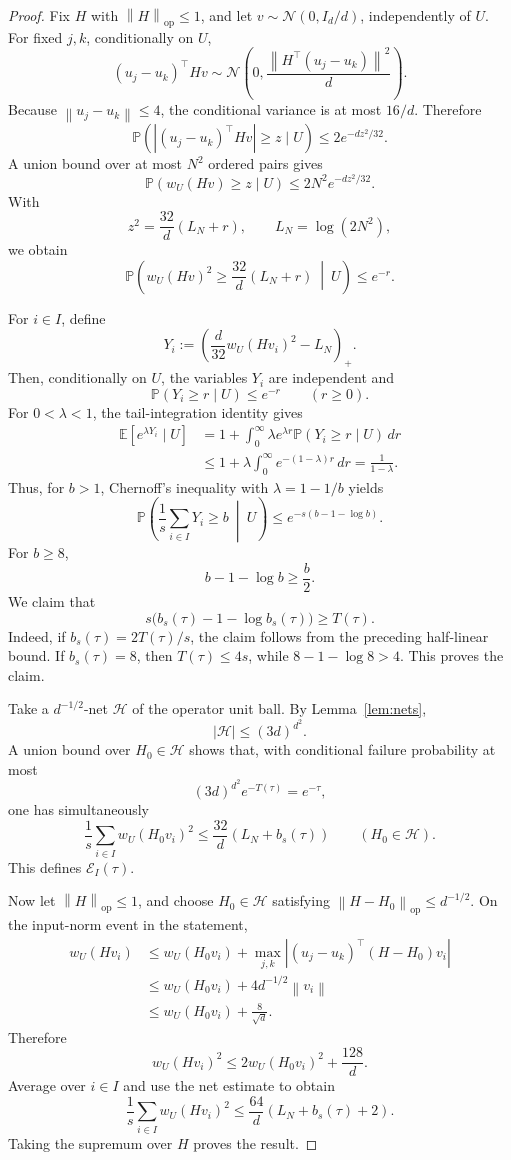 \documentclass[11pt]{article}
\newcommand{\E}{\mathbb{E}}
\newcommand{\Pp}{\mathbb{P}}
\newcommand{\1}{\mathbf{1}}
\newcommand{\op}{\mathrm{op}}
\newcommand{\norm}[1]{\left\|#1\right\|}
\newcommand{\abs}[1]{\left|#1\right|}
\begin{document}
\begin{proof}
Fix \(H\) with \(\norm{H}_{\op}\le1\), and let
\(v\sim\mathcal N(0,I_d/d)\), independently of \(U\).  For fixed \(j,k\),
conditionally on \(U\),
\[
 (u_j-u_k)^\top Hv
 \sim
 \mathcal N\left(
 0,\frac{\norm{H^\top(u_j-u_k)}^2}{d}
 \right).
\]
Because \(\norm{u_j-u_k}\le4\), the conditional variance is at most
\(16/d\).  Therefore
\[
 \Pp\left(
 \abs{(u_j-u_k)^\top Hv}\ge z\mid U
 \right)
 \le2e^{-dz^2/32}.
\]
A union bound over at most \(N^2\) ordered pairs gives
\[
 \Pp\left(w_U(Hv)\ge z\mid U\right)
 \le2N^2e^{-dz^2/32}.
\]
With
\[
 z^2=\frac{32}{d}(L_N+r),
 \qquad
 L_N=\log(2N^2),
\]
we obtain
\[
 \Pp\left(
 w_U(Hv)^2\ge\frac{32}{d}(L_N+r)
 \ \middle|\ U
 \right)
 \le e^{-r}.
\]

For \(i\in I\), define
\[
 Y_i
 :=
 \left(
 \frac d{32}w_U(Hv_i)^2-L_N
 \right)_+.
\]
Then, conditionally on \(U\), the variables \(Y_i\) are independent and
\[
 \Pp(Y_i\ge r\mid U)\le e^{-r}
 \qquad (r\ge0).
\]
For \(0<\lambda<1\), the tail-integration identity gives
\begin{align*}
 \E[e^{\lambda Y_i}\mid U]
 &=
 1+\int_0^\infty \lambda e^{\lambda r}
 \Pp(Y_i\ge r\mid U)\,dr\\
 &\le
 1+\lambda\int_0^\infty e^{-(1-\lambda)r}\,dr
 =\frac1{1-\lambda}.
\end{align*}
Thus, for \(b>1\), Chernoff's inequality with \(\lambda=1-1/b\) yields
\[
 \Pp\left(
 \frac1s\sum_{i\in I}Y_i\ge b
 \ \middle|\ U
 \right)
 \le
 e^{-s(b-1-\log b)}.
\]
For \(b\ge8\),
\[
 b-1-\log b\ge\frac b2.
\]
We claim that
\[
 s\bigl(b_s(\tau)-1-\log b_s(\tau)\bigr)\ge T(\tau).
\]
Indeed, if \(b_s(\tau)=2T(\tau)/s\), the claim follows from the preceding
half-linear bound.  If \(b_s(\tau)=8\), then \(T(\tau)\le4s\), while
\(8-1-\log8>4\).  This proves the claim.

Take a \(d^{-1/2}\)-net \(\mathcal H\) of the operator unit ball.  By
Lemma~\ref{lem:nets},
\[
 \abs{\mathcal H}\le(3d)^{d^2}.
\]
A union bound over \(H_0\in\mathcal H\) shows that, with conditional failure
probability at most
\[
 (3d)^{d^2}e^{-T(\tau)}=e^{-\tau},
\]
one has simultaneously
\[
 \frac1s\sum_{i\in I}w_U(H_0v_i)^2
 \le
 \frac{32}{d}\left(L_N+b_s(\tau)\right)
 \qquad (H_0\in\mathcal H).
\]
This defines \(\mathcal E_I(\tau)\).

Now let \(\norm{H}_{\op}\le1\), and choose \(H_0\in\mathcal H\) satisfying
\(\norm{H-H_0}_{\op}\le d^{-1/2}\).  On the input-norm event in the
statement,
\begin{align*}
 w_U(Hv_i)
 &\le
 w_U(H_0v_i)
 +\max_{j,k}\abs{(u_j-u_k)^\top(H-H_0)v_i}\\
 &\le
 w_U(H_0v_i)
 +4d^{-1/2}\norm{v_i}\\
 &\le
 w_U(H_0v_i)+\frac8{\sqrt d}.
\end{align*}
Therefore
\[
 w_U(Hv_i)^2
 \le
 2w_U(H_0v_i)^2+\frac{128}{d}.
\]
Average over \(i\in I\) and use the net estimate to obtain
\[
 \frac1s\sum_{i\in I}w_U(Hv_i)^2
 \le
 \frac{64}{d}\left(L_N+b_s(\tau)+2\right).
\]
Taking the supremum over \(H\) proves the result.
\end{proof}
\end{document}

